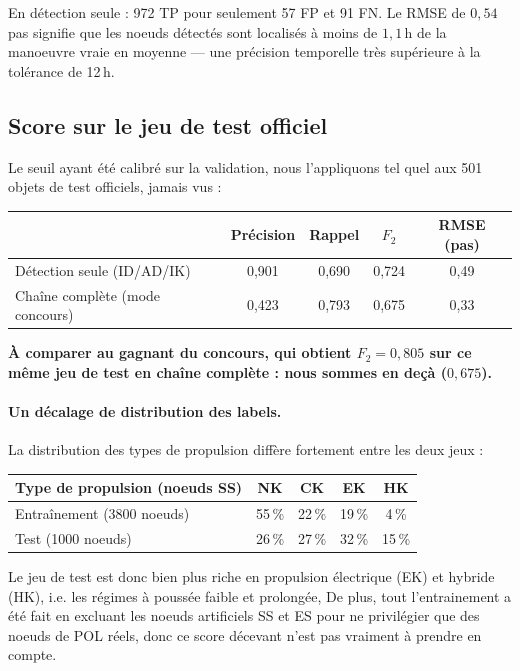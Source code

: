 \documentclass{article}
\begin{document}
En détection seule : 972 TP pour seulement 57 FP et 91 FN. Le RMSE de $0{,}54$ pas signifie que les noeuds détectés sont localisés à moins de $1{,}1$\,h de la manoeuvre vraie en moyenne — une précision temporelle très supérieure à la tolérance de 12\,h.

\subsection{Score sur le jeu de test officiel}

Le seuil ayant été calibré sur la validation, 
nous l'appliquons tel quel aux 501 objets de test officiels, jamais vus :

\begin{center}
\begin{tabular}{lcccc}
\toprule
 & Précision & Rappel & $F_2$ & RMSE (pas) \\
\midrule
Détection seule (ID/AD/IK) & 0,901 & 0,690 & 0,724 & 0,49 \\
Chaîne complète (mode concours) & 0,423 & 0,793 & 0,675 & 0,33 \\
\bottomrule
\end{tabular}
\end{center}

\textbf{À comparer au gagnant du concours, qui obtient $F_2 = 0{,}805$ 
sur ce même jeu de test en chaîne complète : nous sommes en deçà ($0{,}675$).} 

\paragraph{Un décalage de distribution des labels.} 
La distribution des types de propulsion diffère fortement entre les deux jeux :

\begin{center}
\begin{tabular}{lcccc}
\toprule
Type de propulsion (noeuds SS) & NK & CK & EK & HK \\
\midrule
Entraînement (3800 noeuds) & 55\,\% & 22\,\% & 19\,\% & 4\,\% \\
Test (1000 noeuds) & 26\,\% & 27\,\% & 32\,\% & 15\,\% \\
\bottomrule
\end{tabular}
\end{center}

Le jeu de test est donc bien plus riche en propulsion électrique (EK) et hybride (HK), i.e.  les régimes à poussée faible et prolongée, 
De plus, tout l'entrainement a été fait en excluant les noeuds artificiels SS et ES pour ne privilégier que des noeuds de POL réels, donc ce score décevant n'est pas vraiment à prendre en compte.
\end{document}
